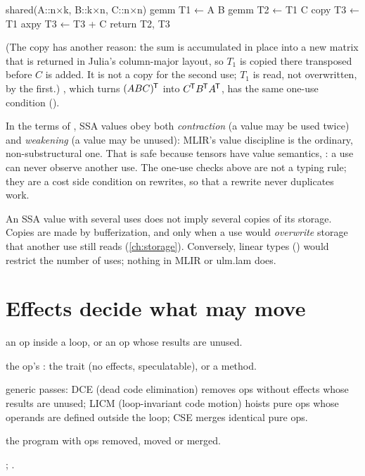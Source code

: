 \begin{textout}
shared(A::n×k, B::k×n, C::n×n)
  gemm     T1 ← A B
  gemm     T2 ← T1 C
  copy     T3 ← T1
  axpy     T3 ← T3 + C
  return T2, T3
\end{textout}

(The copy has another reason: the sum is accumulated in place into a new
matrix that is returned in Julia's column-major layout, so \(T_1\) is
copied there transposed before \(C\) is added. It is not a copy for the
second use; \(T_1\) is read, not overwritten, by the first.)
, which turns \((ABC)^{\mkern-1.5mu\mathsf{T}}\) into \(C^{\mkern-1.5mu\mathsf{T}} B^{\mkern-1.5mu\mathsf{T}} A^{\mkern-1.5mu\mathsf{T}}\), has the
same one-use condition ().

\begin{theory}
In the terms of ,
SSA values obey both \emph{contraction} (a value may be used twice) and
\emph{weakening} (a value may be unused): MLIR's value discipline is the
ordinary, non-substructural one. That is safe because tensors have value
semantics, :
a use can never observe another use. The one-use checks above are not a
typing rule; they are a cost side condition on rewrites, so that a rewrite
never duplicates work.
\end{theory}

\begin{limit}
An SSA value with several uses does not imply several copies of its
storage. Copies are made by bufferization, and only when a use would
\emph{overwrite} storage that another use still reads (\cref{ch:storage}).
Conversely, linear types () would restrict the number of uses;
nothing in MLIR or ulm.lam does.
\end{limit}

\section{Effects decide what may move}
\label{sec:effects}

\begin{steps}
\item[Input] an op inside a loop, or an op whose results are unused.
\item[Representation] the op's : the trait  (no effects, speculatable), or a  method.
\item[Rule] generic passes: DCE (dead code elimination) removes ops without effects whose results are unused; LICM (loop-invariant code motion) hoists pure ops whose operands are defined outside the loop; CSE merges identical pure ops.
\item[Output] the program with ops removed, moved or merged.
\item[Theory] ; .
\end{steps}

